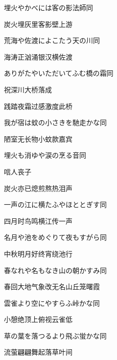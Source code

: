 \begin{haiku}
    {\FH 埋火やかべには客の影法師}\hfill{\FH 同}

    {\FK 炭火埋灰里客影壁上游}
\end{haiku}

\begin{haiku}
    {\FH 荒海や佐渡によこたう天の川}\hfill{\FH 同}

    {\FK 海涛正汹涌银汉横佐渡}
\end{haiku}

\begin{haiku}
    {\FH ありがたやいただいてふむ橋の霜}\hfill{\FH 同}

    {\FK 祝深川大桥落成}

    {\FK 践踏夜霜过感激度此桥}
\end{haiku}

\begin{haiku}
    {\FH 我が宿は蚊の小さきを馳走かな}\hfill{\FH 同}

    {\FK 陋室无长物小蚊款嘉宾}
\end{haiku}

\begin{haiku}
    {\FH 埋火も消ゆや涙の烹る音}\hfill{\FH 同}

    {\FK 唁人丧子}

    {\FK 炭火亦已熄煎熬热泪声}
\end{haiku}

\begin{haiku}
    {\FH 一声の江に横たふやほととぎす}\hfill{\FH 同}

    {\FK 四月时鸟鸣横江传一声}
\end{haiku}

\begin{haiku}
    {\FH 名月や池をめぐりて夜もすがら}\hfill{\FH 同}

    {\FK 中秋明月好终宵绕池行}
\end{haiku}

\begin{haiku}
    {\FH 春なれや名もなき山の朝かすみ}\hfill{\FH 同}

    {\FK 春回大地气象改无名山丘笼曙霞}
\end{haiku}

\begin{haiku}
    {\FH 雲雀より空にやすらふ峠かな}\hfill{\FH 同}

    {\FK 小憩绝顶上俯视云雀低}
\end{haiku}

\begin{haiku}
    {\FH 草の葉を落つるより飛ぶ蛍かな}\hfill{\FH 同}

    {\FK 流萤翩翩舞起落草叶间}
\end{haiku}

